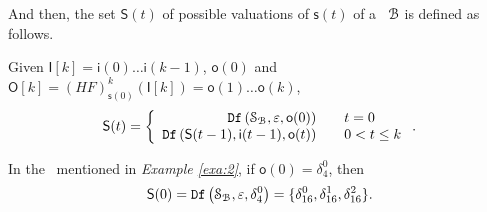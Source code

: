  And then, the set $\mathsf{S}(t)$ of possible valuations of $\mathsf{s}(t)$ of a \BCN\ ${\mathcal{B}}$ is defined as follows. 
 \begin{definition}[$\mathsf{S}(t)$] Given $\mathsf{I}[k]=\mathsf{i}(0)\ldots\mathsf{i}(k-1)$, $\mathsf{o}(0)$ and $\mathsf{O}[k]=(HF)^k_{\mathsf{s}(0)}(\mathsf{I}[k])=\mathsf{o}(1)\ldots\mathsf{o}(k)$, %
	\[\mathsf{S}(t)=\left\{
\begin{array}{rcl}
{\tt Df}\left(\mathcal{S}_{\mathcal{B}},\varepsilon,\mathsf{o}(0)\right)      &      & {t=0}\\
{\tt Df}\left(\mathsf{S}(t-1),\mathsf{i}(t-1),\mathsf{o}(t)\right)       &      & 0<t\leq k
\end{array} \right. .\]

\end{definition}
\begin{example}
In the \BCN\ mentioned in {\em Example \ref{exa:2}}, if $\mathsf{o}(0)=\delta_4^0$, then \[\mathsf{S}(0)={\tt Df}\left(\mathcal{S}_{\mathcal{B}},\varepsilon,\delta_4^0\right)=\{\delta_{16}^0,\delta_{16}^1,\delta_{16}^2\}.\]
 \label{exa:8}
 \end{example}   
 

 
 

